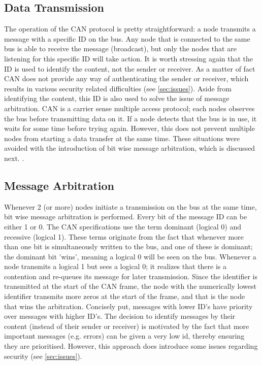 \subsection{Data Transmission}
\label{subsec:can:data_transmission}

The operation of the CAN protocol is pretty straightforward: a node transmits a message with a specific ID on the bus. Any node that is connected to the same bus is able to receive the message (broadcast), but only the nodes that are listening for this specific ID will take action. It is worth stressing again that the ID is used to identify the content, not the sender or receiver. As a matter of fact CAN does not provide any way of authenticating the sender or receiver, which results in various security related difficulties (see \ref{sec:issues}). Aside from identifying the content, this ID is also used to solve the issue of message arbitration. CAN is a carrier sense multiple access protocol; each nodes observes the bus before transmitting data on it. If a node detects that the bus is in use, it waits for some time before trying again. However, this does not prevent multiple nodes from starting a data transfer at the same time. These situations were avoided with the introduction of bit wise message arbitration, which is discussed next. \cite{CANarbitration}.

\subsection{Message Arbitration}
\label{subsec:can:message_arbitration}

Whenever 2 (or more) nodes initiate a transmission on the bus at the same time, bit wise message arbitration is performed. Every bit of the message ID can be either 1 or 0. The CAN specifications use the term dominant (logical 0) and recessive (logical 1). These terms originate from the fact that whenever more than one bit is simultaneously written to the bus, and one of these is dominant; the dominant bit 'wins', meaning a logical 0 will be seen on the bus. Whenever a node transmits a logical 1 but sees a logical 0; it realizes that there is a contention and re-queues its message for later transmission. Since the identifier is transmitted at the start of the CAN frame, the node with the numerically lowest identifier transmits more zeros at the start of the frame, and that is the node that wins the arbitration. Concisely put, messages with lower ID's have priority over messages with higher ID's. The decision to identify messages by their content (instead of their sender or receiver) is motivated by the fact that more important messages (e.g. errors) can be given a very low id, thereby ensuring they are prioritised. However, this approach does introduce some issues regarding security (see \ref{sec:issues}).

